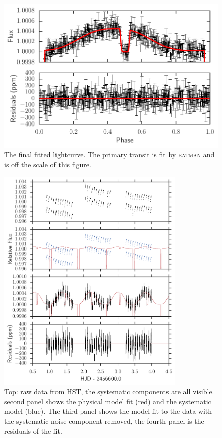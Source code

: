 \documentclass[a4paper,fleqn,usenatbib]{mnras}
\begin{document}
\begin{figure}
\begin{center}
\includegraphics[width=\columnwidth]{img/new_lc.pdf}
\caption{The final fitted lightcurve. The primary transit is fit by \textsc{batman} and is off the scale of this figure.}
\label{fig:phase folded}
\end{center}
\end{figure}

\begin{figure}
\begin{center}
\includegraphics[width=0.8\textwidth]{img/systematics.pdf}
\caption{Top: raw data from HST, the systematic components are all visible. second panel shows the physical model fit (red) and the systematic model (blue). The third panel shows the model fit to the data with the systematic noise component removed, the fourth panel is the residuals of the fit.
}
\label{fig:systematics}
\end{center}
\end{figure}
\end{document}

